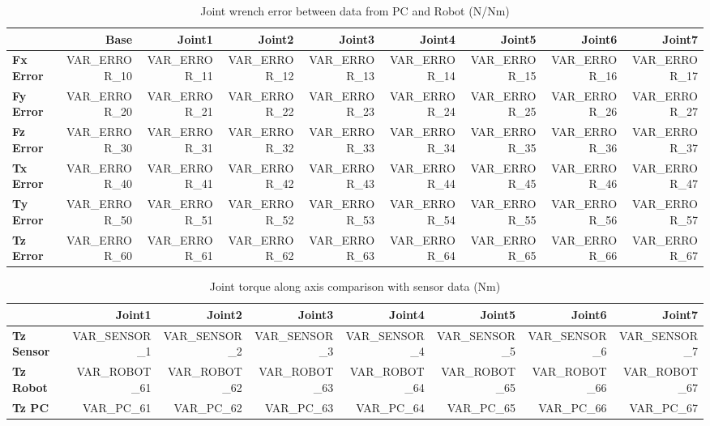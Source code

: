 \begin{table}[h!]
	\centering
	\caption{Joint wrench error between data from PC and Robot (N/Nm)}
	\label{VAR_LABEL_ERROR}
	\begin{tabular}{|l|r|r|r|r|r|r|r|r|}
		\hline
		\textbf{}  & \textbf{Base} & \textbf{Joint1}  & \textbf{Joint2}  & \textbf{Joint3}  & \textbf{Joint4}  & \textbf{Joint5}  & \textbf{Joint6}  & \textbf{Joint7} \\ \hline
		\textbf{Fx Error}  & VAR_ERROR_10        & VAR_ERROR_11        & VAR_ERROR_12        & VAR_ERROR_13        & VAR_ERROR_14        & VAR_ERROR_15        & VAR_ERROR_16        & VAR_ERROR_17 \\ \hline
		\textbf{Fy Error}  & VAR_ERROR_20        & VAR_ERROR_21        & VAR_ERROR_22        & VAR_ERROR_23        & VAR_ERROR_24        & VAR_ERROR_25        & VAR_ERROR_26        & VAR_ERROR_27 \\ \hline
		\textbf{Fz Error}  & VAR_ERROR_30        & VAR_ERROR_31        & VAR_ERROR_32        & VAR_ERROR_33        & VAR_ERROR_34        & VAR_ERROR_35        & VAR_ERROR_36        & VAR_ERROR_37 \\ \hline
		\textbf{Tx Error}  & VAR_ERROR_40        & VAR_ERROR_41        & VAR_ERROR_42        & VAR_ERROR_43        & VAR_ERROR_44        & VAR_ERROR_45        & VAR_ERROR_46        & VAR_ERROR_47 \\ \hline
		\textbf{Ty Error}  & VAR_ERROR_50        & VAR_ERROR_51        & VAR_ERROR_52        & VAR_ERROR_53        & VAR_ERROR_54        & VAR_ERROR_55        & VAR_ERROR_56        & VAR_ERROR_57 \\ \hline
		\textbf{Tz Error}  & VAR_ERROR_60        & VAR_ERROR_61        & VAR_ERROR_62        & VAR_ERROR_63        & VAR_ERROR_64        & VAR_ERROR_65        & VAR_ERROR_66        & VAR_ERROR_67 \\ \hline
	\end{tabular}
\end{table}

\begin{table}[h!]
	\centering
	\caption{Joint torque along axis comparison with sensor data (Nm)}
	\label{VAR_LABEL_SENSOR}
	\begin{tabular}{|l|r|r|r|r|r|r|r|}
		\hline
		\textbf{} & \textbf{Joint1} & \textbf{Joint2} & \textbf{Joint3} & \textbf{Joint4} & \textbf{Joint5} & \textbf{Joint6} & \textbf{Joint7} \\ \hline
		\textbf{Tz Sensor}  & VAR_SENSOR_1           & VAR_SENSOR_2           & VAR_SENSOR_3            & VAR_SENSOR_4           & VAR_SENSOR_5           & VAR_SENSOR_6           & VAR_SENSOR_7           \\ \hline
		\textbf{Tz Robot}  	& VAR_ROBOT_61           & VAR_ROBOT_62           & VAR_ROBOT_63            & VAR_ROBOT_64           & VAR_ROBOT_65           & VAR_ROBOT_66           & VAR_ROBOT_67           \\ \hline
		\textbf{Tz PC}  	& VAR_PC_61           & VAR_PC_62           & VAR_PC_63            & VAR_PC_64           & VAR_PC_65           & VAR_PC_66           & VAR_PC_67           \\ \hline
	\end{tabular}
\end{table}

